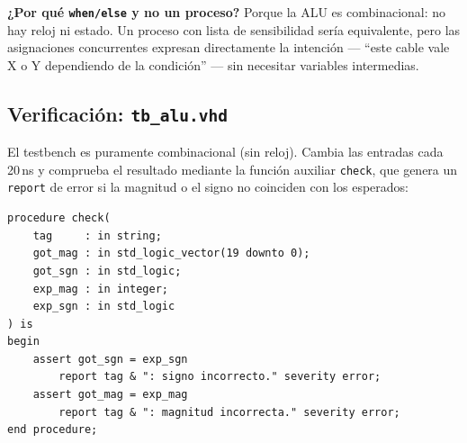 \documentclass[memoria_final]{subfiles}
\begin{document}
\begin{tcolorbox}[colback=SoftOrange,colframe=MainOrange,boxrule=0.8pt,arc=2pt,
  left=0.5cm,right=0.5cm,top=0.3cm,bottom=0.3cm]
  \small\faLightbulb\enspace\textbf{¿Por qué \texttt{when/else} y no un
  proceso?} Porque la ALU es combinacional: no hay reloj ni estado. Un
  proceso con lista de sensibilidad sería equivalente, pero las asignaciones
  concurrentes expresan directamente la intención --- ``este cable vale X o
  Y dependiendo de la condición'' --- sin necesitar variables intermedias.
\end{tcolorbox}

\subsection{Verificación: \texttt{tb\_alu.vhd}}

El testbench es puramente combinacional (sin reloj). Cambia las entradas cada
20\,ns y comprueba el resultado mediante la función auxiliar \texttt{check},
que genera un \texttt{report} de error si la magnitud o el signo no coinciden
con los esperados:

\begin{lstlisting}[caption={Procedimiento \texttt{check} del testbench \texttt{tb\_alu}}]
procedure check(
    tag     : in string;
    got_mag : in std_logic_vector(19 downto 0);
    got_sgn : in std_logic;
    exp_mag : in integer;
    exp_sgn : in std_logic
) is
begin
    assert got_sgn = exp_sgn
        report tag & ": signo incorrecto." severity error;
    assert got_mag = exp_mag
        report tag & ": magnitud incorrecta." severity error;
end procedure;
\end{lstlisting}
\end{document}
